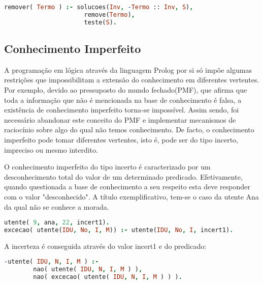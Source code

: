 \documentclass[a4paper]{article}
\begin{document}
\begin{lstlisting}[language=Prolog, caption=Predicado que permite a remoção de conhecimento perfeito.]
remover( Termo ) :- solucoes(Inv, -Termo :: Inv, S),
					  remove(Termo),
					  teste(S).
\end{lstlisting}


\subsection{Conhecimento Imperfeito}


\hspace{3mm} A programação em lógica através da linguagem Prolog por si só impõe algumas restrições que impossibilitam a extensão do conhecimento em diferentes vertentes. Por exemplo, devido ao pressuposto do mundo fechado(PMF), que afirma que toda a informação que não é mencionada na base de conhecimento é falsa, a existência de conhecimento imperfeito torna-se impossível. Assim sendo, foi necessário abandonar este conceito do PMF e implementar mecanismos de raciocínio sobre algo do qual não temos conhecimento. De facto, o conhecimento imperfeito pode tomar diferentes vertentes, isto é, pode ser do tipo incerto, impreciso ou mesmo interdito.

O conhecimento imperfeito do tipo incerto é caracterizado por um desconhecimento total do valor de um determinado predicado. Efetivamente, quando questionada a base de conhecimento a seu respeito esta deve responder com o valor "desconhecido". A título exemplificativo, tem-se o caso da utente Ana da qual não se conhece a morada.

\begin{lstlisting}[language=Prolog, caption=Exemplo de conhecimento imperfeito do tipo incerto.]
utente( 9, ana, 22, incert1).
excecao( utente(IDU, No, I, M)) :- utente(IDU, No, I, incert1).
\end{lstlisting}

A incerteza é conseguida através do valor incert1 e do predicado:

\begin{lstlisting}[language=Prolog, caption=Negaçao forte relacionada com o predicado utente.]
-utente( IDU, N, I, M ) :-
        nao( utente( IDU, N, I, M ) ),
        nao( excecao( utente( IDU, N, I, M ) ) ).
\end{lstlisting}
\end{document}
